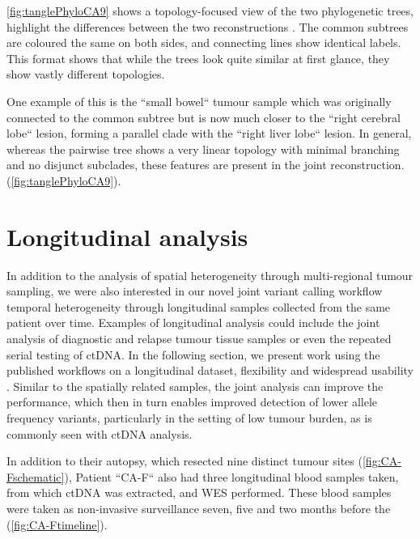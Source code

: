 \autoref{fig:tanglePhyloCA9} shows a topology-focused view of the two phylogenetic trees,  highlight the differences between the two reconstructions \cite{Vienne2018}. The common subtrees are coloured the same on both sides, and connecting lines show identical labels. This format shows that while the trees look quite similar at first glance, they show vastly different topologies.


One example of this is the ``small bowel`` tumour sample which was originally connected to the  common  subtree but is now much closer to the ``right cerebral lobe`` lesion, forming a parallel clade with the ``right liver lobe`` lesion. In general, whereas the pairwise tree shows a very linear topology with minimal branching and no disjunct subclades, these features are  present in the joint reconstruction.  (\autoref{fig:tanglePhyloCA9}).


\section[Longitudinal analysis]{Longitudinal analysis}
\label{variantcalling-sec:longitudinal}

In addition to the analysis of spatial heterogeneity through multi-regional tu\-mour sam\-pling, we were also interested in  our novel joint variant calling workflow  temporal heterogeneity through longitudinal samples collected from the same patient over time. Examples of longitudinal analysis could include the joint analysis of diagnostic and relapse tumour tissue samples or even the repeated serial testing of ctDNA. In the following section, we present work using the published workflows on a longitudinal dataset,  flexibility and widespread usability . Similar to the spatially related samples, the joint analysis can improve the performance, which then in turn enables improved detection of lower allele frequency variants, particularly in the setting of low tumour burden, as is commonly seen with ctDNA analysis.

In addition to their autopsy, which resected nine distinct tumour sites (\autoref{fig:CA-Fschematic}), Patient ``CA-F`` also had three longitudinal blood samples taken, from which ctDNA was extracted, and WES performed. These blood samples were taken as non-invasive surveillance seven, five and two months before the  (\autoref{fig:CA-Ftimeline}).


